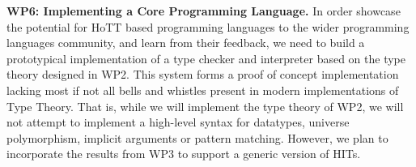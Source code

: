 \documentclass[a4paper,11pt]{article}
\begin{document}
  





{\bf WP6: Implementing a Core Programming Language.} In order showcase
the potential for HoTT based programming languages to the wider
programming languages community, and learn from their feedback, we
need to build a prototypical implementation of a type checker and
interpreter based on the type theory designed in WP2.  This system
forms a proof of concept implementation lacking most if not all bells
and whistles present in modern implementations of Type Theory. That
is, while we will implement the type theory of WP2, we will not
attempt to implement a high-level syntax for datatypes, universe
polymorphism, implicit arguments or pattern matching. However, we plan
to incorporate the results from WP3 to support a generic version of
HITs.
\end{document}
